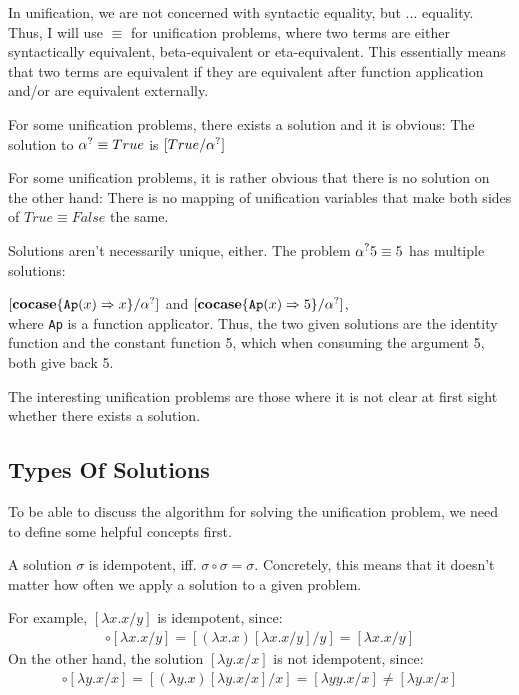 \documentclass[twoside,12pt,a4paper]{article}
\begin{document}
In unification, we are not concerned with syntactic equality, but ... equality.
Thus, I will use $\equiv$ for unification problems, where two terms are either syntactically equivalent, beta-equivalent or eta-equivalent.
This essentially means that two terms are equivalent if they are equivalent after function application and/or are equivalent externally.

For some unification problems, there exists a solution and it is obvious:
The solution to $\alpha^? \equiv True$ is $[True/\alpha^?]$

For some unification problems, it is rather obvious that there is no solution on the other hand:
There is no mapping of unification variables that make both sides of $True \equiv False$ the same.

Solutions aren't necessarily unique, either. The problem $\alpha^? 5 \equiv 5$ has multiple solutions: 

$[\textbf{cocase}\{\texttt{Ap}(x)\Rightarrow x\} / \alpha^?]$ and $[\textbf{cocase}\{\texttt{Ap}(x)\Rightarrow 5\} / \alpha^?]$,\\
where \texttt{Ap} is a function applicator. 
Thus, the two given solutions are the identity function and the constant function 5, which when consuming the argument 5, both give back 5.

The interesting unification problems are those where it is not clear at first sight whether there exists a solution.

\subsection{Types Of Solutions} %

To be able to discuss the algorithm for solving the unification problem, we need to define some helpful concepts first.

\begin{definition}[Idempotency]
    A solution $\sigma$ is idempotent, iff. $\sigma \circ \sigma = \sigma$.
    Concretely, this means that it doesn't matter how often we apply a solution to a given problem.
\end{definition}

For example, $[\lambda x.x / y]$ is idempotent, since:
\begin{align*}
    [\lambda x.x / y] \circ [\lambda x.x / y] = [(\lambda x.x)[\lambda x.x / y] / y]
    = [\lambda x.x / y] 
\end{align*}
On the other hand, the solution $[\lambda y. x / x]$ is not idempotent, since:
\begin{align*}
    [\lambda y. x / x] \circ [\lambda y. x / x] = [(\lambda y.x)[\lambda y.x / x] / x] 
    = [\lambda yy.x / x] \neq [\lambda y. x / x]
\end{align*}
\end{document}
